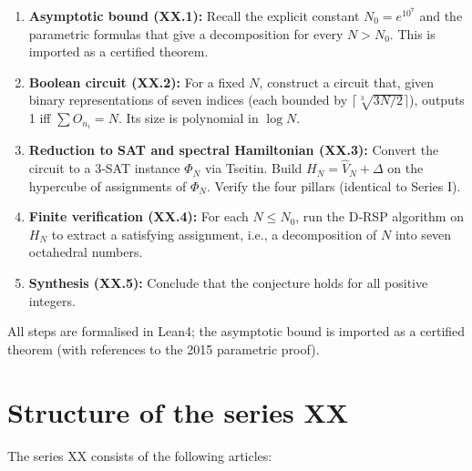 \documentclass[11pt,a4paper]{article}
\begin{document}
\begin{enumerate}
\item \textbf{Asymptotic bound (XX.1):} Recall the explicit constant \(N_0 = e^{10^7}\) and the parametric formulas that give a decomposition for every \(N > N_0\). This is imported as a certified theorem.
\item \textbf{Boolean circuit (XX.2):} For a fixed \(N\), construct a circuit that, given binary representations of seven indices (each bounded by \(\lceil \sqrt[3]{3N/2}\rceil\)), outputs 1 iff \(\sum O_{n_i}=N\). Its size is polynomial in \(\log N\).
\item \textbf{Reduction to SAT and spectral Hamiltonian (XX.3):} Convert the circuit to a 3‑SAT instance \(\Phi_N\) via Tseitin. Build \(H_N = \hat{V}_N + \Delta\) on the hypercube of assignments of \(\Phi_N\). Verify the four pillars (identical to Series I).
\item \textbf{Finite verification (XX.4):} For each \(N\le N_0\), run the D‑RSP algorithm on \(H_N\) to extract a satisfying assignment, i.e., a decomposition of \(N\) into seven octahedral numbers.
\item \textbf{Synthesis (XX.5):} Conclude that the conjecture holds for all positive integers.
\end{enumerate}

All steps are formalised in Lean4; the asymptotic bound is imported as a certified theorem (with references to the 2015 parametric proof).

\section{Structure of the series XX}

The series XX consists of the following articles:
\end{document}
